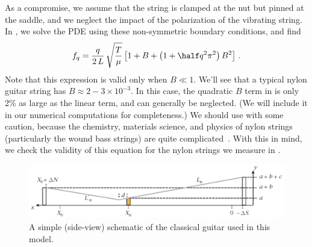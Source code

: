 As a compromise, we assume that the string is clamped at the nut but pinned at the saddle, and we neglect the impact of the polarization of the vibrating string. In , we solve the PDE using these non-symmetric boundary conditions, and find
 \begin{equation} \label{eqn:f_m_stiff}
f_q = \frac{q}{2\, L}\, \sqrt{\frac{T}{\mu}} \left[ 1 + B + \left( 1 + \half q^2 \pi^2 \right) B^2 \right]\, .
 \end{equation}
Note that this expression is valid only when $B \ll 1$. We'll see that a typical nylon guitar string has $B \approx 2 - 3 \times 10^{-3}$. In this case, the quadratic $B$ term in  is only 2\% as large as the linear term, and can generally be neglected. (We will include it in our numerical computations for completeness.) We should use  with some caution, because the chemistry, materials science, and physics of nylon strings (particularly the wound bass strings) are quite complicated~\cite{ref:blanc1996nvb,ref:lynchaird2017mpn,ref:lynchaird2018cmp}. With this in mind, we check the validity of this equation for the nylon strings we measure in .

 \begin{figure}
  \centering
  \includegraphics[width=7.0in]{figures/fretting_schematic}
  \caption{\label{fig:guitar_schematic} A simple (side-view) schematic of the classical guitar used in this model.}
 \end{figure}

